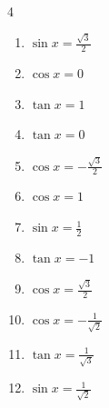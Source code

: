 \begin{multicols}{4}
\begin{enumerate}
  \item $\displaystyle \sin{x}  = \frac{\sqrt{3}}{2}$


  \item $\displaystyle \cos{x}  = 0$


  \item $\displaystyle \tan{x}  = 1$


  \item $\displaystyle \tan{x}  = 0$


  \item $\displaystyle \cos{x}  = -\frac{\sqrt{3}}{2}$


  \item $\displaystyle \cos{x}  = 1$


  \item $\displaystyle \sin{x}  = \frac{1}{2}$


  \item $\displaystyle \tan{x}  = -1$


  \item $\displaystyle \cos{x}  = \frac{\sqrt{3}}{2}$


  \item $\displaystyle \cos{x}  = -\frac{1}{\sqrt{2}}$


  \item $\displaystyle \tan{x}  = \frac{1}{\sqrt{3}}$


  \item $\displaystyle \sin{x}  = \frac{1}{\sqrt{2}}$


\end{enumerate}
\end{multicols}

